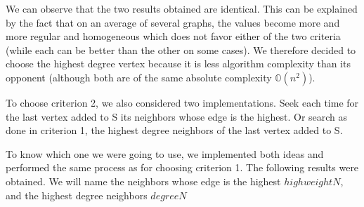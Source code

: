 We can observe that the two results obtained are identical. This can be explained by the fact that on an average of several graphs, the values become more and more regular and homogeneous which does not favor either of the two criteria (while each can be better than the other on some cases). We therefore decided to choose the highest degree vertex because it is less algorithm complexity than its opponent (although both are of the same absolute complexity $\mathbb{O}(n^2)$).
\bigskip

To choose criterion 2, we also considered two implementations. Seek each time for the last vertex added to S its neighbors whose edge is the highest. Or search as done in criterion 1, the highest degree neighbors of the last vertex added to S.
\bigskip

To know which one we were going to use, we implemented both ideas and performed the same process as for choosing criterion 1. The following results were obtained. We will name the neighbors whose edge is the highest $highweightN$, and the highest degree neighbors $degreeN$
\bigskip

